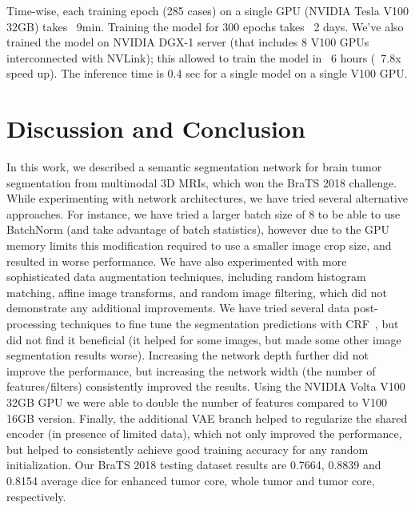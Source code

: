\documentclass[runningheads]{llncs}
\begin{document}
Time-wise, each training epoch (285 cases) on a single GPU (NVIDIA Tesla V100 32GB) takes ~9min. Training the model for 300 epochs takes ~2 days. We've also trained the model on NVIDIA DGX-1 server (that includes 8 V100 GPUs  interconnected with NVLink); this allowed to train the model in ~6 hours (~7.8x speed up). The inference time is 0.4 sec for a single model on a single V100 GPU.



 
\section{Discussion and Conclusion}
 \label{sec:conclusion}
 
In this work, we described a semantic segmentation network for brain tumor segmentation from multimodal 3D MRIs, which won the BraTS 2018 challenge. 
While experimenting with network architectures, we have tried several alternative approaches. For instance, we have tried a larger batch size of 8  to be able to use BatchNorm (and take advantage of batch statistics), however due to the GPU memory limits this modification required to use a smaller image crop size, and resulted in worse performance. We have also experimented with more sophisticated data augmentation techniques, including random histogram matching, affine image transforms, and random image filtering, which did not demonstrate any additional improvements.  We have tried several data post-processing techniques to fine tune the segmentation predictions with CRF~\cite{Kamnitsas16}, but did not find it beneficial (it helped for some images, but made some other image segmentation results worse).  Increasing the network depth further did not improve the performance, but increasing the network width (the number of features/filters) consistently improved the results. Using the NVIDIA Volta V100 32GB GPU we were able to double the number of features compared to V100 16GB version. Finally, the additional VAE branch helped to regularize the shared encoder (in presence of limited data), which not only improved the performance, but helped to consistently achieve good training accuracy for any random initialization.  Our BraTS 2018 testing dataset results are 0.7664, 0.8839 and 0.8154 average dice for enhanced tumor core, whole tumor and tumor core, respectively. 


%
%


\end{document}
